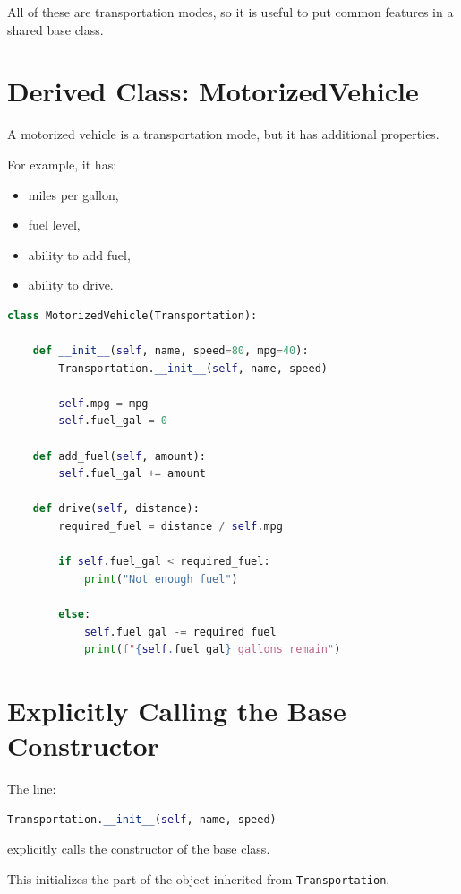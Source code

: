 \documentclass[11pt]{article}
\begin{document}
All of these are transportation modes, so it is useful to put common features in a shared base class.

\section{Derived Class: MotorizedVehicle}

A motorized vehicle is a transportation mode, but it has additional properties.

For example, it has:

\begin{itemize}
    \item miles per gallon,
    \item fuel level,
    \item ability to add fuel,
    \item ability to drive.
\end{itemize}

\begin{lstlisting}[language=Python]
class MotorizedVehicle(Transportation):

    def __init__(self, name, speed=80, mpg=40):
        Transportation.__init__(self, name, speed)

        self.mpg = mpg
        self.fuel_gal = 0

    def add_fuel(self, amount):
        self.fuel_gal += amount

    def drive(self, distance):
        required_fuel = distance / self.mpg

        if self.fuel_gal < required_fuel:
            print("Not enough fuel")

        else:
            self.fuel_gal -= required_fuel
            print(f"{self.fuel_gal} gallons remain")
\end{lstlisting}

\section{Explicitly Calling the Base Constructor}

The line:

\begin{lstlisting}[language=Python]
Transportation.__init__(self, name, speed)
\end{lstlisting}

explicitly calls the constructor of the base class.

This initializes the part of the object inherited from \texttt{Transportation}.
\end{document}
